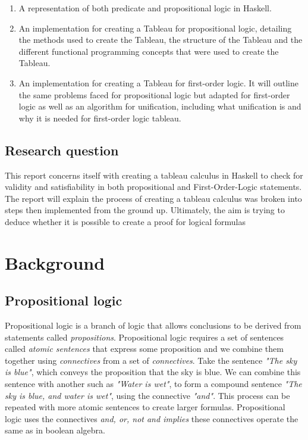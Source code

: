 \documentclass{article}%
\begin{document}
\begin{enumerate}
\item A representation of both predicate and propositional logic in Haskell.
\item An implementation for creating a Tableau for propositional logic, detailing the methods used to create the Tableau, the structure of the Tableau and the different functional programming concepts that were used to create the Tableau.
\item An implementation for creating a Tableau for first-order logic. It will outline the same problems faced for propositional logic but adapted for first-order logic as well as an algorithm for unification, including what unification is and why it is needed for first-order logic tableau. 
\end{enumerate}


\subsection{Research question}
This report concerns itself with creating a tableau calculus in Haskell to check for validity and satisfiability in both propositional and First-Order-Logic statements. The report will explain  the process of creating a tableau calculus was broken into steps then implemented from the ground up. Ultimately, the aim is trying to deduce whether it is possible to create a proof for logical formulas

\section{Background}
\subsection{Propositional logic}
Propositional logic is a branch of logic that allows conclusions to be derived from statements called \textit{propositions}. Propositional logic requires a set of sentences called \textit{atomic sentences} that express some proposition and we combine them together using \textit{connectives} from a set of \textit{connectives}. Take the sentence \textit{"The sky is blue"}, which conveys the proposition that the sky is blue. We can combine this sentence with another such as \textit{"Water is wet"}, to form a compound sentence \textit{"The sky is blue, and water is wet"}, using the connective \textit{"and"}. This process can be repeated with more atomic sentences to create larger formulas. Propositional logic uses the connectives \textit{and, or, not and implies} these connectives operate the same as in boolean algebra.
\end{document}
